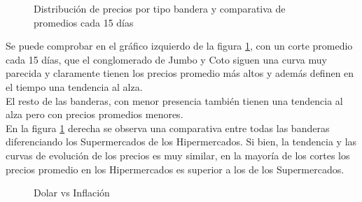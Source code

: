 \begin{figure}[h]
\centering
{}%
\hspace{0.25cm}%
\caption{Distribución de precios por tipo bandera y comparativa de promedios cada 15 días}
\label{Distr_comparativa}
\end{figure}


Se puede comprobar en el gráfico izquierdo de la figura \ref{Distr_comparativa}, con un corte promedio cada 15 días, que el conglomerado de Jumbo y Coto siguen una curva muy parecida y claramente tienen los precios promedio más altos y además definen en el tiempo una tendencia al alza.\\
El resto de las banderas, con menor presencia también tienen una tendencia al alza pero con precios promedios menores.\\
En la figura \ref{Distr_comparativa} derecha se observa una comparativa entre todas las banderas diferenciando los Supermercados de los Hipermercados. Si bien, la tendencia y las curvas de evolución de los precios es muy similar, en la mayoría de los cortes los precios promedio en los Hipermercados es superior a los de los Supermercados.\\

\begin{figure}
\centering
{}%
\caption{Dolar vs Inflación}
\label{dolar_vs_inflasion}
\end{figure}

